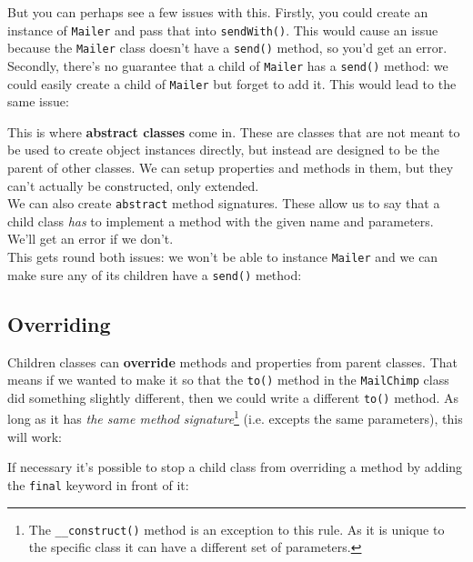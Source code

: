But you can perhaps see a few issues with this. Firstly, you could create an instance of \texttt{Mailer} and pass that into \texttt{sendWith()}. This would cause an issue because the \texttt{Mailer} class doesn't have a \texttt{send()} method, so you'd get an error. Secondly, there's no guarantee that a child of \texttt{Mailer} has a \texttt{send()} method: we could easily create a child of \texttt{Mailer} but forget to add it. This would lead to the same issue:


This is where \textbf{abstract classes} come in. These are classes that are not meant to be used to create object instances directly, but instead are designed to be the parent of other classes. We can setup properties and methods in them, but they can't actually be constructed, only extended.
\\

We can also create \texttt{abstract} method signatures. These allow us to say that a child class \textit{has} to implement a method with the given name and parameters. We'll get an error if we don't.
\\

This gets round both issues: we won't be able to instance \texttt{Mailer} and we can make sure any of its children have a \texttt{send()} method:



\subsection{Overriding}

Children classes can \textbf{override} methods and properties from parent classes. That means if we wanted to make it so that the \texttt{to()} method in the \texttt{MailChimp} class did something slightly different, then we could write a different \texttt{to()} method. As long as it has \textit{the same method signature}\footnote{The \texttt{\_\_construct()} method is an exception to this rule. As it is unique to the specific class it can have a different set of parameters.} (i.e. excepts the same parameters), this will work:


If necessary it's possible to stop a child class from overriding a method by adding the \texttt{final} keyword in front of it:


